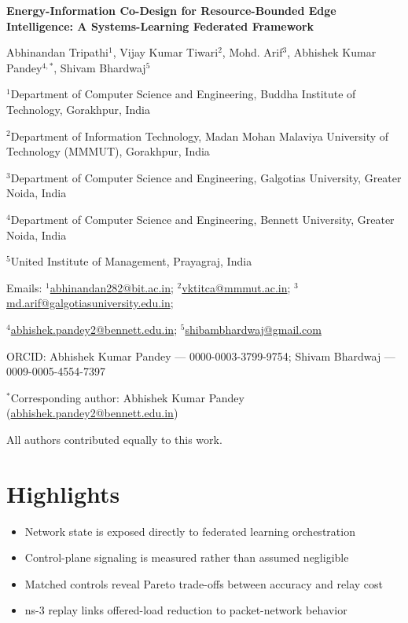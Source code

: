 \documentclass[11pt]{article}
\begin{document}
\begin{center}
{\LARGE\bfseries Energy-Information Co-Design for Resource-Bounded Edge Intelligence: A Systems-Learning Federated Framework}\par\vspace{0.8em}
{\large Abhinandan Tripathi$^{1}$, Vijay Kumar Tiwari$^{2}$, Mohd. Arif$^{3}$, Abhishek Kumar Pandey$^{4,*}$, Shivam Bhardwaj$^{5}$}\par
$^{1}$Department of Computer Science and Engineering, Buddha Institute of Technology, Gorakhpur, India\par
$^{2}$Department of Information Technology, Madan Mohan Malaviya University of Technology (MMMUT), Gorakhpur, India\par
$^{3}$Department of Computer Science and Engineering, Galgotias University, Greater Noida, India\par
$^{4}$Department of Computer Science and Engineering, Bennett University, Greater Noida, India\par
$^{5}$United Institute of Management, Prayagraj, India\par
Emails: $^{1}$\href{mailto:abhinandan282@bit.ac.in}{abhinandan282@bit.ac.in}; $^{2}$\href{mailto:vktitca@mmmut.ac.in}{vktitca@mmmut.ac.in}; $^{3}$\href{mailto:md.arif@galgotiasuniversity.edu.in}{md.arif@galgotiasuniversity.edu.in};\par
$^{4}$\href{mailto:abhishek.pandey2@bennett.edu.in}{abhishek.pandey2@bennett.edu.in}; $^{5}$\href{mailto:shibambhardwaj@gmail.com}{shibambhardwaj@gmail.com}\par
ORCID: Abhishek Kumar Pandey — 0000-0003-3799-9754; Shivam Bhardwaj — 0009-0005-4554-7397\par
$^*$Corresponding author: Abhishek Kumar Pandey (\href{mailto:abhishek.pandey2@bennett.edu.in}{abhishek.pandey2@bennett.edu.in})\par
All authors contributed equally to this work.
\end{center}\vspace{0.8em}
\section*{Highlights}
\begin{itemize}
\item Network state is exposed directly to federated learning orchestration
\item Control-plane signaling is measured rather than assumed negligible
\item Matched controls reveal Pareto trade-offs between accuracy and relay cost
\item ns-3 replay links offered-load reduction to packet-network behavior
\end{itemize}
\end{document}
